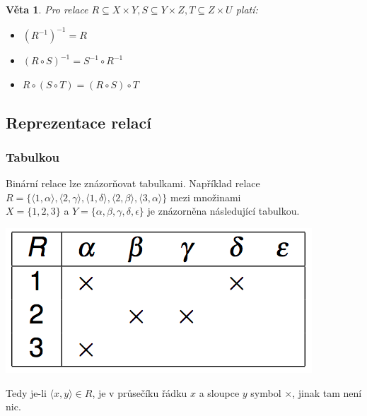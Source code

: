 \documentclass[12pt,a4paper]{article}
\newtheorem{sentence}{Věta}
\begin{document}
\begin{sentence}
	Pro relace $R \subseteq X \times Y, S \subseteq Y \times Z, T \subseteq Z \times U$ platí:
	\begin{itemize}
		\item[a)] $(R^{-1})^{-1} = R$
		\item[b)] $(R \circ S)^{-1} = S^{-1} \circ R^{-1}$
		\item[c)] $R \circ (S \circ T) = (R \circ S) \circ T$
	\end{itemize}
\end{sentence}

\subsection{Reprezentace relací}

\subsubsection{Tabulkou}
Binární relace lze znázorňovat tabulkami. Například relace \\$R = \{ \langle 1, \alpha \rangle, \langle 2, \gamma \rangle, \langle 1, \delta \rangle, \langle 2, \beta \rangle, \langle 3, \alpha \rangle\}$ mezi množinami \\$X = \{1,2,3\}$ a $Y = \{\alpha, \beta, \gamma, \delta, \epsilon\}$ je znázorněna následující tabulkou.

\begin{center}
	\includegraphics[scale=0.5]{images/1/RelationTable}
\end{center}

Tedy je-li $\langle x, y \rangle \in R$, je v průsečíku řádku $x$ a sloupce $y$ symbol $\times$, jinak tam není nic.
\end{document}
